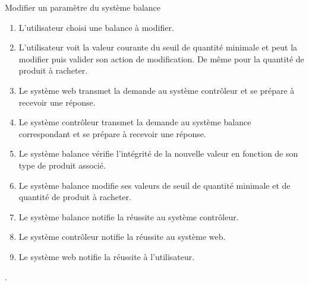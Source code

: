 \begin{UseCase}{Modifier un paramètre du système balance}
\begin{UseCaseScenario}
    \begin{enumerate}
        \item L'utilisateur choisi une balance à modifier.
        \item L'utilisateur voit la valeur courante du seuil de quantité
            minimale et peut la modifier puis valider son action de
            modification. De même pour la quantité de produit à racheter.
        \item Le système web transmet la demande au système contrôleur et se
            prépare à recevoir une réponse.
        \item Le système contrôleur transmet la demande au système balance
            correspondant et se prépare à recevoir une réponse.
        \item Le système balance vérifie l'intégrité de la nouvelle valeur en
            fonction de son type de produit associé.
        \item Le système balance modifie ses valeurs de seuil de quantité
            minimale et de quantité de produit à racheter.
        \item Le système balance notifie la réussite au système contrôleur.
        \item Le système contrôleur notifie la réussite au système web.
        \item Le système web notifie la réussite à l'utilisateur.
    \end{enumerate}.
\end{UseCaseScenario}


\end{UseCase}
